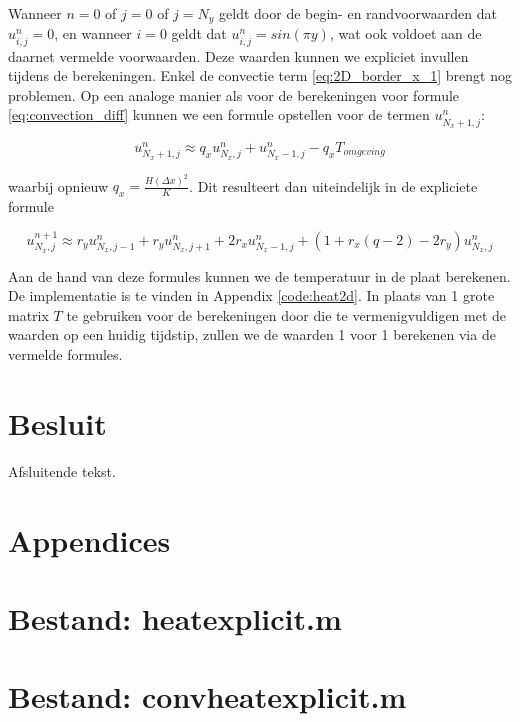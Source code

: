 \documentclass[a4paper,kulak]{kulakarticle} %
\newcommand{\inputcode}[1]{
	
}
\begin{document}
Wanneer $n = 0$ of $j = 0$ of $j = N_y$ geldt door de begin- en randvoorwaarden dat $u_{i, j}^n = 0$, en wanneer $i = 0$ geldt dat $u_{i, j}^n = sin(\pi y)$, wat ook voldoet aan de daarnet vermelde voorwaarden. Deze waarden kunnen we expliciet invullen tijdens de berekeningen. Enkel de convectie term \ref{eq:2D_border_x_1} brengt nog problemen. Op een analoge manier als voor de berekeningen voor formule \ref{eq:convection_diff} kunnen we een formule opstellen voor de termen $u_{N_x + 1, j}^n$:

\begin{equation}
	u_{N_x + 1, j}^n 
	\approx
	q_x u_{N_x, j}^n + u_{N_x - 1, j}^n - q_x T_{omgeving}
\end{equation}

waarbij opnieuw $q_x = \frac{H (\Delta x)^2}{K}$. Dit resulteert dan uiteindelijk in de expliciete formule

\begin{equation}
	u_{N_x, j}^{n+1}
	\approx
	r_y u_{N_x, j-1}^n + r_y u_{N_x, j+1}^n  %
	+ 2 r_x u_{N_x - 1, j}^n %
	+ \left(1 + r_x(q - 2) - 2 r_y\right) u_{N_x, j}^n  %
\end{equation}

Aan de hand van deze formules kunnen we de temperatuur in de plaat berekenen. De implementatie is te vinden in Appendix \ref{code:heat2d}. In plaats van 1 grote matrix $T$ te gebruiken voor de berekeningen door die te vermenigvuldigen met de waarden op een huidig tijdstip, zullen we de waarden 1 voor 1 berekenen via de vermelde formules.

\section*{Besluit}

Afsluitende tekst.

\section*{Appendices}

\appendix

\section{Bestand: heat\textunderscore explicit.m}
	\label{code:heat_explicit}
	\inputcode{heat_explicit}

\newpage
\section{Bestand: convheat\textunderscore explicit.m}
	\label{code:convheat_explicit}
	\inputcode{convheat_explicit}
	
\end{document}
